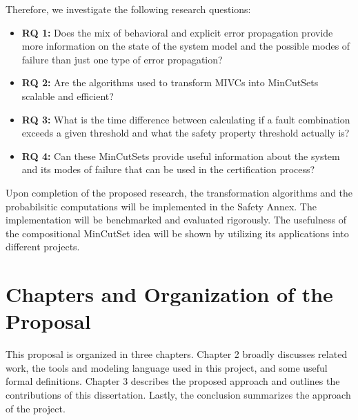 Therefore, we investigate the following research questions:
\begin{itemize}
\item \textbf{RQ 1:} Does the mix of behavioral and explicit error propagation provide more information on the state of the system model and the possible modes of failure than just one type of error propagation?

\item \textbf{RQ 2:} Are the algorithms used to transform MIVCs into MinCutSets scalable and efficient?

\item \textbf{RQ 3:} What is the time difference between calculating if a fault combination exceeds a given threshold and what the safety property threshold actually is?

\item \textbf{RQ 4:} Can these MinCutSets provide useful information about the system and its modes of failure that can be used in the certification process?

\end{itemize}

Upon completion of the proposed research, the transformation algorithms and the probabilsitic computations will be implemented in the Safety Annex. The implementation will be benchmarked and evaluated rigorously. The usefulness of the compositional MinCutSet idea will be shown by utilizing its applications into different projects.

\section{Chapters and Organization of the Proposal}
This proposal is organized in three chapters. Chapter 2 broadly discusses related work, the tools and modeling language used in this project, and some useful formal definitions. Chapter 3 describes the proposed approach and outlines the contributions of this dissertation. Lastly, the conclusion summarizes the approach of the project.


